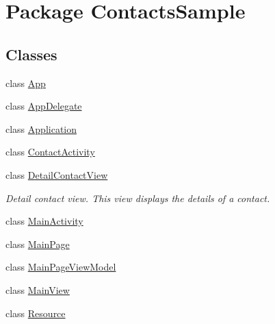 \hypertarget{namespace_contacts_sample}{\section{Package Contacts\+Sample}
\label{namespace_contacts_sample}
}
\subsection*{Classes}
\begin{DoxyCompactItemize}
\item 
class \hyperlink{class_contacts_sample_1_1_app}{App}
\item 
class \hyperlink{class_contacts_sample_1_1_app_delegate}{App\+Delegate}
\item 
class \hyperlink{class_contacts_sample_1_1_application}{Application}
\item 
class \hyperlink{class_contacts_sample_1_1_contact_activity}{Contact\+Activity}
\item 
class \hyperlink{class_contacts_sample_1_1_detail_contact_view}{Detail\+Contact\+View}
\begin{DoxyCompactList}\small\item\em Detail contact view. This view displays the details of a contact. \end{DoxyCompactList}\item 
class \hyperlink{class_contacts_sample_1_1_main_activity}{Main\+Activity}
\item 
class \hyperlink{class_contacts_sample_1_1_main_page}{Main\+Page}
\item 
class \hyperlink{class_contacts_sample_1_1_main_page_view_model}{Main\+Page\+View\+Model}
\item 
class \hyperlink{class_contacts_sample_1_1_main_view}{Main\+View}
\item 
class \hyperlink{class_contacts_sample_1_1_resource}{Resource}
\end{DoxyCompactItemize}
